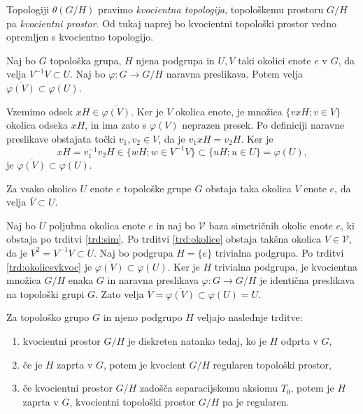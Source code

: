 \documentclass[mat1]{fmfdelo}
\newcommand{\closure}[1]{\overline{#1}}
\begin{document}
Topologiji $\theta(G/H)$ pravimo \emph{kvocientna topologija}, topološkemu prostoru $G/H$ pa \emph{kvocientni prostor}. Od tukaj naprej bo kvocientni topološki prostor vedno opremljen s kvocientno topologijo.


\begin{trditev}\label{trd:okolicevkvoc}
Naj bo $G$ topološka grupa, $H$ njena podgrupa in $U, V$ taki okolici enote $e$ v $G$, da velja $V^{-1}V \subset U$. Naj bo $\varphi: G \to G/H$ naravna preslikava. Potem velja $\closure{\varphi(V)} \subset \varphi(U)$.
\end{trditev}

\begin{dokaz}
Vzemimo odsek $xH \in \closure{\varphi(V)}$. Ker je $V$ okolica enote, je množica $\lbrace vxH ; v \in V \rbrace$ okolica odseka $xH$, in ima zato s $\varphi(V)$ neprazen presek. Po definiciji naravne preslikave obstajata točki $v_1, v_2 \in V$, da je $v_1xH = v_2H$. Ker je \[xH = v_1^{-1}v_2H \in \lbrace wH ; w \in V^{-1}V \rbrace \subset \lbrace uH ; u \in U \rbrace = \varphi(U), \]
je $\closure{\varphi(V)} \subset \varphi(U)$.
\end{dokaz}

\begin{posledica}\label{pos:sim}
Za vsako okolico $U$ enote $e$ topološke grupe $G$ obstaja taka okolica $V$ enote $e$, da velja $\closure{V} \subset U$.
\end{posledica}

\begin{dokaz}
Naj bo $U$ poljubna okolica enote $e$ in naj bo $\mathcal{V}$ baza simetričnih okolic enote $e$, ki obstaja po trditvi \ref{trd:sim}. Po trditvi \ref{trd:okolice} obstaja takšna okolica $V \in \mathcal{V}$, da je $V^2 = V^{-1}V \subset U$. Naj bo podgrupa $H = \lbrace e \rbrace$ trivialna podgrupa. Po trditvi \ref{trd:okolicevkvoc} je $\closure{\varphi(V)} \subset \varphi(U)$. Ker je $H$ trivialna podgrupa, je kvocientna množica $G/H$ enaka $G$ in naravna preslikava $\varphi\colon G \to G/H$ je identična preslikava na topološki grupi $G$. Zato velja $\closure{V} = \closure{\varphi(V)} \subset \varphi(U) = U$.
\end{dokaz}

\begin{izrek}\label{izr:kvocreg}
Za topološko grupo $G$ in njeno podgrupo $H$ veljajo naslednje trditve:
\begin{enumerate}
\item kvocientni prostor $G/H$ je diskreten natanko tedaj, ko je $H$ odprta v $G$,\label{podtrd:kvocreg1}
\item če je $H$ zaprta v $G$, potem je kvocient $G/H$ regularen topološki prostor,\label{podtrd:kvocreg2}
\item če kvocientni prostor $G/H$ zadošča separacijskemu aksiomu $T_0$, potem je $H$ zaprta v $G$, kvocientni topološki prostor $G/H$ pa je regularen.\label{podtrd:kvocreg3}
\end{enumerate}
\end{izrek}
\end{document}
